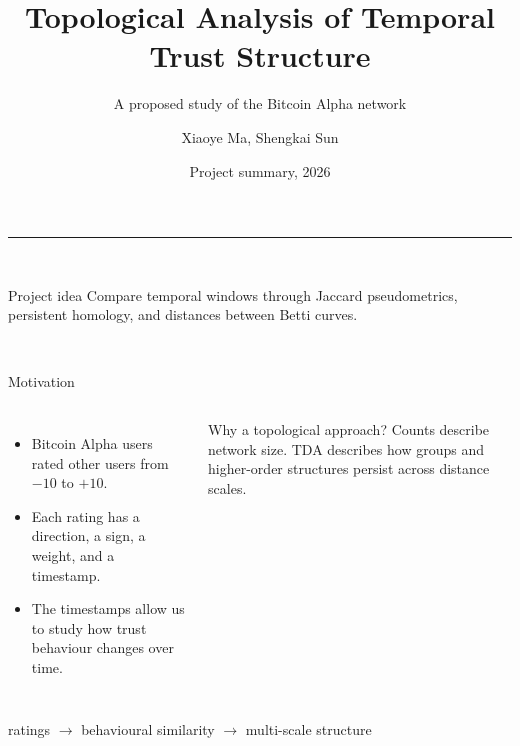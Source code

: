 \documentclass[aspectratio=169,11pt]{beamer}
\title{Topological Analysis of Temporal Trust Structure}
\subtitle{A proposed study of the Bitcoin Alpha network}
\author{Xiaoye Ma, Shengkai Sun}
\institute{SF2956 Topological Data Analysis}
\date{Project summary, 2026}
\begin{document}
\begin{frame}[plain]
  \vspace{0.8cm}
  {\color{Ocean}\rule{2.1cm}{3pt}}\\[0.45cm]
  {\color{Ink}\inserttitle\par}
  \vspace{0.22cm}
  {\color{Muted}\insertsubtitle\par}

  \vfill
  \begin{block}{Project idea}
    Compare temporal windows through Jaccard pseudometrics, persistent homology, and distances between Betti curves.
  \end{block}

  \vfill
  {\small\insertauthor\hfill\insertinstitute\\[0.12cm]
  \color{Muted}\insertdate}
\end{frame}

\begin{frame}{Motivation}
  \begin{columns}[T,onlytextwidth]
      \begin{itemize}
        \item Bitcoin Alpha users rated other users from $-10$ to $+10$.
        \item Each rating has a direction, a sign, a weight, and a timestamp.
        \item The timestamps allow us to study how trust behaviour changes over time.
      \end{itemize}

      \begin{block}{Why a topological approach?}
        Counts describe network size. TDA describes how groups and higher-order structures persist across distance scales.
      \end{block}
  \end{columns}

  \vspace{0.45cm}
  \centering
  {\large\color{Ink}
  ratings $\longrightarrow$ behavioural similarity $\longrightarrow$ multi-scale structure}
\end{frame}
\end{document}
